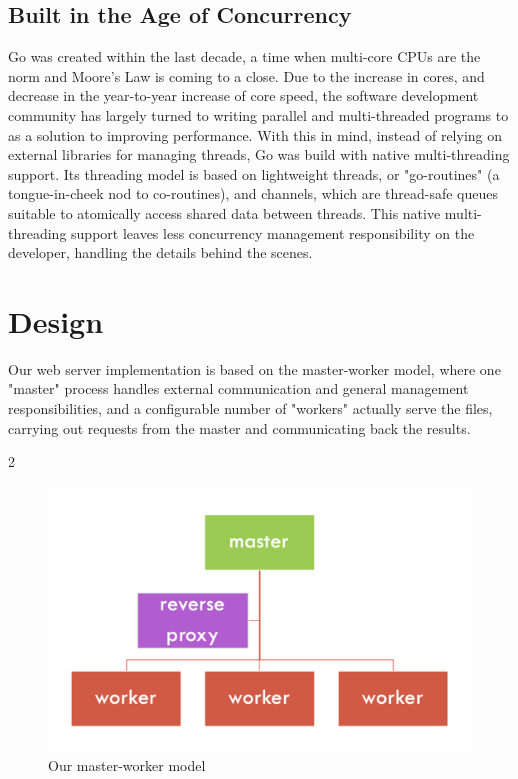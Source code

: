 \documentclass[10pt]{article}
\begin{document}
\begin{multicols}{2}
\subsection*{Built in the Age of Concurrency}
\par
Go was created within the last decade, a time when multi-core CPUs are the norm and Moore's Law is coming to a close.  Due to the increase in cores, and decrease in the year-to-year increase of core speed, the software development community has largely turned to writing parallel and multi-threaded programs to as a solution to improving performance.  With this in mind, instead of relying on external libraries for managing threads, Go was build with native multi-threading support. Its threading model is based on lightweight threads, or "go-routines" (a tongue-in-cheek nod to co-routines), and channels, which are thread-safe queues suitable to atomically access shared data between threads. This native multi-threading support leaves less concurrency management responsibility on the developer, handling the details behind the scenes.
\section*{Design}
\par
Our web server implementation is based on the master-worker model, where one "master" process handles external communication and general management responsibilities, and a configurable number of "workers" actually serve the files, carrying out requests from the master and communicating back the results.
\end{multicols}{2}
\begin{figure}
\centering
        \includegraphics[totalheight=9cm]{./images/masterworker.png}
        \caption{Our master-worker model}
\end{figure}
\end{document}
